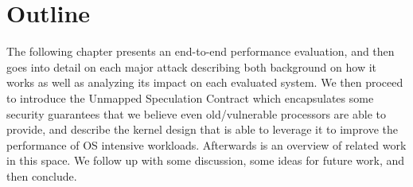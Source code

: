 \section{Outline}
The following chapter presents an end-to-end performance evaluation, and then goes into detail on each major attack describing both background on how it works as well as analyzing its impact on each evaluated system.
We then proceed to introduce the Unmapped Speculation Contract which encapsulates some security guarantees that we believe even old/vulnerable processors are able to provide, and describe the \sys kernel design that is able to leverage it to improve the performance of OS intensive workloads.
Afterwards is an overview of related work in this space.
We follow up with some discussion, some ideas for future work, and then conclude.
